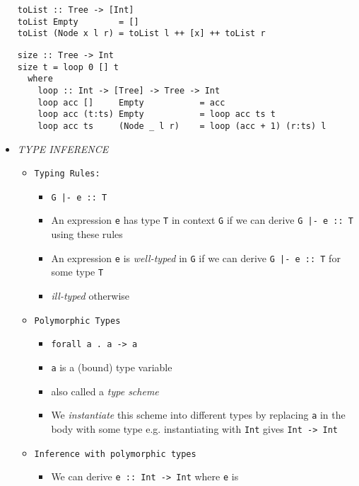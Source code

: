 \documentclass[landscape,8pt]{extarticle}
\newcommand{\code}{\lstinline}
\begin{document}
\begin{multicols}{3}
\begin{itemize}
\begin{lstlisting}
toList :: Tree -> [Int]
toList Empty        = []
toList (Node x l r) = toList l ++ [x] ++ toList r
\end{lstlisting}
              \begin{lstlisting}
size :: Tree -> Int
size t = loop 0 [] t
  where
    loop :: Int -> [Tree] -> Tree -> Int
    loop acc []     Empty           = acc
    loop acc (t:ts) Empty           = loop acc ts t
    loop acc ts     (Node _ l r)    = loop (acc + 1) (r:ts) l
\end{lstlisting}
       \item \emph{TYPE INFERENCE}
              \begin{itemize}
                  \item \code{Typing Rules:}
                        \begin{itemize}
                            \item \code{G |- e :: T}
                            \item An expression \code{e} has type \code{T} in context \code{G} if we can derive \code{G |- e :: T} using these rules
                            \item An expression \code{e} is \emph{well-typed} in \code{G} if we can derive \code{G |- e :: T} for some type \code{T}
                            \item \emph{ill-typed} otherwise
                        \end{itemize}
                  \item \code{Polymorphic Types}
                        \begin{itemize}
                            \item \code{forall a . a -> a}
                            \item \code{a} is a (bound) type variable
                            \item also called a \emph{type scheme}
                            \item We \emph{instantiate} this scheme into different types by replacing \code{a} in the body with some type e.g. instantiating with \code{Int} gives \code{Int -> Int}
                        \end{itemize}
                  \item \code{Inference with polymorphic types}
                        \begin{itemize}
                            \item We can derive \code{e :: Int -> Int} where \code{e} is

\end{itemize}
\end{itemize}
\end{itemize}
\end{multicols}
\end{document}
